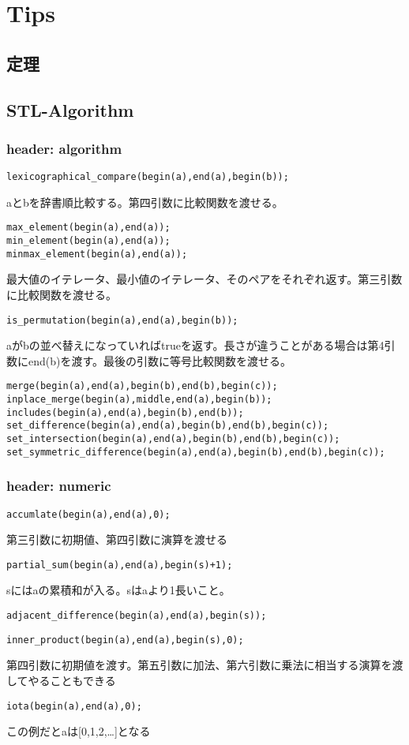 \section{Tips}

\subsection{定理}

\subsection{STL-Algorithm}
\subsubsection{header: algorithm}
\begin{lstlisting}[caption=辞書順比較]
lexicographical_compare(begin(a),end(a),begin(b));
\end{lstlisting}
aとbを辞書順比較する。第四引数に比較関数を渡せる。
\begin{lstlisting}[caption=最大値、最小値]
max_element(begin(a),end(a));
min_element(begin(a),end(a));
minmax_element(begin(a),end(a));
\end{lstlisting}
最大値のイテレータ、最小値のイテレータ、そのペアをそれぞれ返す。第三引数に比較関数を渡せる。
\begin{lstlisting}[caption=順列]
is_permutation(begin(a),end(a),begin(b));
\end{lstlisting}
aがbの並べ替えになっていればtrueを返す。長さが違うことがある場合は第4引数にend(b)を渡す。最後の引数に等号比較関数を渡せる。
\begin{lstlisting}[caption=ソート済みコンテナ操作]
merge(begin(a),end(a),begin(b),end(b),begin(c));
inplace_merge(begin(a),middle,end(a),begin(b));
includes(begin(a),end(a),begin(b),end(b));
set_difference(begin(a),end(a),begin(b),end(b),begin(c));
set_intersection(begin(a),end(a),begin(b),end(b),begin(c));
set_symmetric_difference(begin(a),end(a),begin(b),end(b),begin(c));
\end{lstlisting}
\subsubsection{header: numeric}
\begin{lstlisting}[caption=和]
accumlate(begin(a),end(a),0);
\end{lstlisting}
第三引数に初期値、第四引数に演算を渡せる
\begin{lstlisting}[caption=累積和]
partial_sum(begin(a),end(a),begin(s)+1);
\end{lstlisting}
sにはaの累積和が入る。sはaより1長いこと。
\begin{lstlisting}[caption=階差数列]
adjacent_difference(begin(a),end(a),begin(s));
\end{lstlisting}
\begin{lstlisting}[caption=内積]
inner_product(begin(a),end(a),begin(s),0);
\end{lstlisting}
第四引数に初期値を渡す。第五引数に加法、第六引数に乗法に相当する演算を渡してやることもできる
\begin{lstlisting}[caption=連続した数列]
iota(begin(a),end(a),0);
\end{lstlisting}
この例だとaは[0,1,2,\ldots]となる
